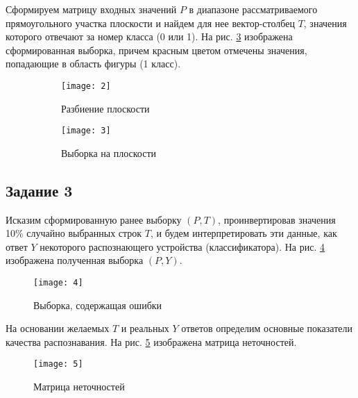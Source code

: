 Сформируем матрицу входных значений $P$ в диапазоне рассматриваемого прямоугольного участка плоскости и найдем для нее вектор-столбец $T$, значения которого отвечают за номер класса (0 или 1). На рис. \ref{fig:two_classes_sample} изображена сформированная выборка, причем красным цветом отмечены значения, попадающие в область фигуры (1 класс).

\begin{figure}[H]
\begin{center}
	\begin{subfigure}[b]{0.49\textwidth}
		\texttt{[image: 2]}
		\caption{Разбиение плоскости}
		\label{fig:two_classes_plane_splitting}
	\end{subfigure}
	\begin{subfigure}[b]{0.49\textwidth}
		\texttt{[image: 3]}
		\caption{Выборка на плоскости}
		\label{fig:two_classes_sample}
	\end{subfigure}
	\caption{}
\end{center}
\end{figure}

\subsection{Задание 3}

Исказим сформированную ранее выборку $(P, T)$, проинвертировав значения 10\% случайно выбранных строк $T$, и будем интерпретировать эти данные, как ответ $Y$ некоторого распознающего устройства (классификатора). На рис. \ref{fig:two_classes_noise} изображена полученная выборка $(P, Y)$.

\begin{figure}[H]
\begin{center}
	\texttt{[image: 4]}
	\caption{Выборка, содержащая ошибки}
	\label{fig:two_classes_noise}
\end{center}
\end{figure}

На основании желаемых $T$ и реальных $Y$ ответов определим основные показатели качества распознавания. На рис. \ref{fig:two_classes_conf_matrix} изображена матрица неточностей.

\begin{figure}[H]
\begin{center}
	\texttt{[image: 5]}
	\caption{Матрица неточностей}
	\label{fig:two_classes_conf_matrix}
\end{center}
\end{figure}

